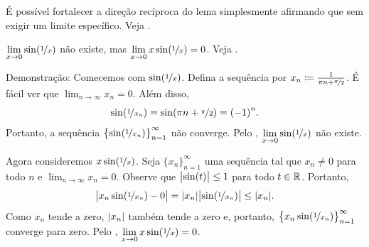 É possível fortalecer a direção recíproca do lema simplesmente afirmando que
 sem exigir um limite específico.
Veja .

\begin{example}
$\displaystyle \lim_{x \to 0} \sin( \nicefrac{1}{x} )$
não existe, mas
$\displaystyle \lim_{x \to 0} x\sin( \nicefrac{1}{x} ) = 0$.
Veja .

\begin{myfigureht}
\caption{Gráficos de $\sin(\nicefrac{1}{x})$ e $x \sin(\nicefrac{1}{x})$.
Observe que o computador não consegue representar corretamente
$\sin(\nicefrac{1}{x})$ perto de zero, pois a oscilação é rápida demais.\label{figsin1x}}
\end{myfigureht}

Demonstração:
Comecemos com $\sin(\nicefrac{1}{x})$. Defina a sequência
por
$x_n \coloneqq \frac{1}{\pi n + \nicefrac{\pi}{2}}$. É fácil ver
que $\lim_{n\to\infty} x_n = 0$. Além disso,
\begin{equation*}
\sin ( \nicefrac{1}{x_n} )
=
\sin (\pi n + \nicefrac{\pi}{2})
= {(-1)}^n .
\end{equation*}
Portanto, a sequência $\bigl\{ \sin ( \nicefrac{1}{x_n} ) \bigr\}_{n=1}^\infty$ não converge.
Pelo
,
$\displaystyle \lim_{x \to 0} \sin( \nicefrac{1}{x} )$ não existe.

Agora consideremos $x\sin(\nicefrac{1}{x})$. Seja $\{ x_n \}_{n=1}^\infty$ uma sequência
tal que $x_n \neq 0$ para todo $n$ e $\lim_{n\to\infty} x_n = 0$.
Observe que $\bigl\lvert {\sin(t)} \bigr\rvert \leq 1$ para todo $t \in {\mathbb{R}}$. Portanto,
\begin{equation*}
\bigl\lvert {x_n\sin(\nicefrac{1}{x_n})-0} \bigr\rvert
=
\lvert {x_n} \rvert\bigl\lvert {\sin(\nicefrac{1}{x_n})} \bigr\rvert
\leq
\lvert {x_n} \rvert .
\end{equation*}
Como $x_n$ tende a zero, $\lvert {x_n} \rvert$ também tende a zero e, portanto,
$\bigl\{ x_n\sin(\nicefrac{1}{x_n}) \bigr\}_{n=1}^\infty$ converge para zero. Pelo
,
$\displaystyle \lim_{x \to 0} x\sin( \nicefrac{1}{x} ) = 0$.
\end{example}

